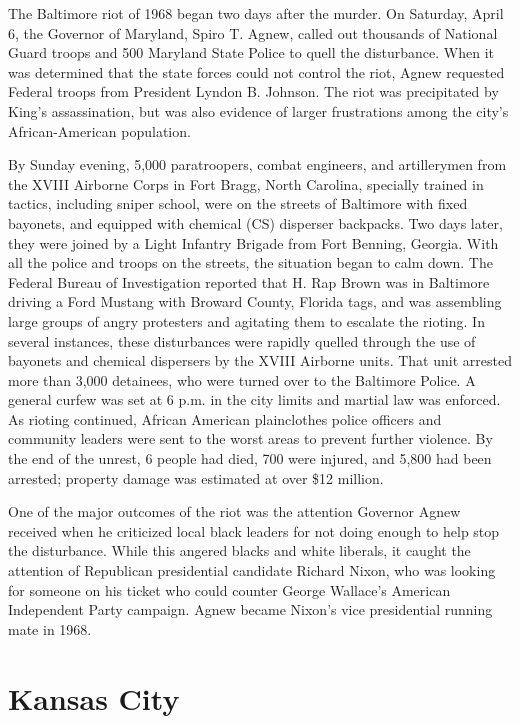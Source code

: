 The Baltimore riot of 1968 began two days after the murder. On Saturday,
April 6, the Governor of Maryland, Spiro T. Agnew, called out thousands
of National Guard troops and 500 Maryland State Police to quell the
disturbance. When it was determined that the state forces could not
control the riot, Agnew requested Federal troops from President Lyndon
B. Johnson. The riot was precipitated by King's assassination, but was
also evidence of larger frustrations among the city's African-American
population.

By Sunday evening, 5,000 paratroopers, combat engineers, and
artillerymen from the XVIII Airborne Corps in Fort Bragg, North
Carolina, specially trained in tactics, including sniper school, were on
the streets of Baltimore with fixed bayonets, and equipped with chemical
(CS) disperser backpacks. Two days later, they were joined by a Light
Infantry Brigade from Fort Benning, Georgia. With all the police and
troops on the streets, the situation began to calm down. The Federal
Bureau of Investigation reported that H. Rap Brown was in Baltimore
driving a Ford Mustang with Broward County, Florida tags, and was
assembling large groups of angry protesters and agitating them to
escalate the rioting. In several instances, these disturbances were
rapidly quelled through the use of bayonets and chemical dispersers by
the XVIII Airborne units. That unit arrested more than 3,000 detainees,
who were turned over to the Baltimore Police. A general curfew was set
at 6 p.m. in the city limits and martial law was enforced. As rioting
continued, African American plainclothes police officers and community
leaders were sent to the worst areas to prevent further violence. By the
end of the unrest, 6 people had died, 700 were injured, and 5,800 had
been arrested; property damage was estimated at over \$12 million.

One of the major outcomes of the riot was the attention Governor Agnew
received when he criticized local black leaders for not doing enough to
help stop the disturbance. While this angered blacks and white liberals,
it caught the attention of Republican presidential candidate Richard
Nixon, who was looking for someone on his ticket who could counter
George Wallace's American Independent Party campaign. Agnew became
Nixon's vice presidential running mate in 1968.

\section{Kansas City}\label{kansas-city}

